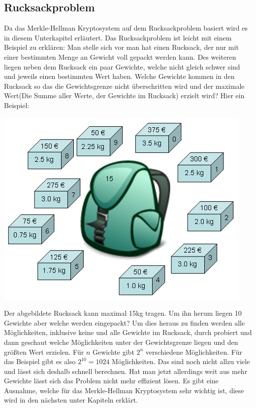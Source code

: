 \documentclass[a4paper,12pt,titlepage]{article}
\begin{document}
\subsection{Rucksackproblem}\label{rucksack}
Da das Merkle-Hellman Kryptosystem auf dem Rucksackproblem basiert wird es in diesem Unterkapitel erläutert. \newline Das Rucksackproblem ist leicht mit einem Beispiel zu erklären: Man stelle sich vor man hat einen Rucksack, der nur mit einer bestimmten Menge an Gewicht voll gepackt werden kann. Des weiteren liegen neben dem Rucksack ein paar Gewichte, welche nicht gleich schwer sind und jeweils einen bestimmten Wert haben. Welche Gewichte kommen in den Rucksack so das die Gewichtsgrenze nicht überschritten wird und der maximale Wert(Die Summe aller Werte, der Gewichte im Rucksack) erzielt wird? \newline
Hier ein Beispiel:
\begin{center}
\includegraphics[scale=0.7]{rucksackproblem.png} %
\end{center}
Der abgebildete Rucksack kann maximal 15kg tragen. Um ihn herum liegen 10 Gewichte aber welche werden eingepackt? Um dies heraus zu finden werden alle Möglichkeiten, inklusive keine und alle Gewichte im Rucksack, durch probiert und dann geschaut welche Möglichkeiten unter der Gewichtsgrenze liegen und den größten Wert erzielen. Für $n$ Gewichte gibt $2^{n}$ verschiedene Möglichkeiten. Für das Beispiel gibt es also $2^{10} = 1024$ Möglichkeiten. Das sind noch nicht allzu viele und lässt sich deshalb schnell berechnen. Hat man jetzt allerdings weit aus mehr Gewichte lässt sich das Problem nicht mehr effizient lösen. Es gibt eine Ausnahme, welche für das Merkle-Hellman Kryptosystem sehr wichtig ist, diese wird in den nächsten unter Kapiteln erklärt.
\end{document}
